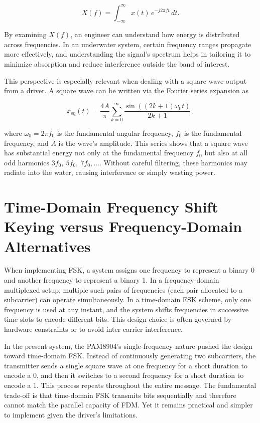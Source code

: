 \[
X(f) = \int_{-\infty}^{\infty} x(t)\,e^{-j 2\pi f t} \, dt.
\]

By examining \( X(f) \), an engineer can understand how energy is distributed across frequencies. In an underwater system, certain frequency ranges propagate more effectively, and understanding the signal's spectrum helps in tailoring it to minimize absorption and reduce interference outside the band of interest. 

This perspective is especially relevant when dealing with a square wave output from a driver. A square wave can be written via the Fourier series expansion as

\[
x_{\text{sq}}(t) = \frac{4A}{\pi} \sum_{k=0}^{\infty} \frac{\sin((2k+1)\omega_0 t)}{2k+1},
\]

where \(\omega_0 = 2\pi f_0\) is the fundamental angular frequency, \(f_0\) is the fundamental frequency, and \(A\) is the wave's amplitude. This series shows that a square wave has substantial energy not only at the fundamental frequency \(f_0\) but also at all odd harmonics \(3f_0,\ 5f_0,\ 7f_0,\ldots\). Without careful filtering, these harmonics may radiate into the water, causing interference or simply wasting power.

\section{Time-Domain Frequency Shift Keying versus Frequency-Domain Alternatives}

When implementing FSK, a system assigns one frequency to represent a binary 0 and another frequency to represent a binary 1. In a frequency-domain multiplexed setup, multiple such pairs of frequencies (each pair allocated to a subcarrier) can operate simultaneously. In a time-domain FSK scheme, only one frequency is used at any instant, and the system shifts frequencies in successive time slots to encode different bits. This design choice is often governed by hardware constraints or to avoid inter-carrier interference.

In the present system, the PAM8904's single-frequency nature pushed the design toward time-domain FSK. Instead of continuously generating two subcarriers, the transmitter sends a single square wave at one frequency for a short duration to encode a 0, and then it switches to a second frequency for a short duration to encode a 1. This process repeats throughout the entire message. The fundamental trade-off is that time-domain FSK transmits bits sequentially and therefore cannot match the parallel capacity of FDM. Yet it remains practical and simpler to implement given the driver's limitations.

